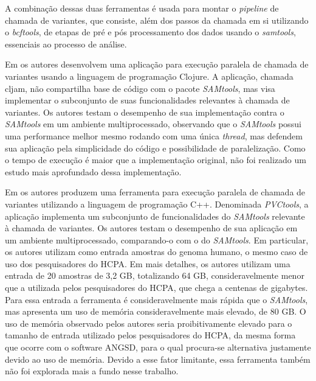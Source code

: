 \documentclass[cic,tc]{iiufrgs}
\begin{document}
A combinação dessas duas ferramentas é usada para montar o \textit{pipeline} de chamada
de variantes, que consiste, além dos passos da chamada em si utilizando o
\textit{bcftools}, de etapas de pré e pós processamento dos dados usando o \textit{samtools},
essenciais ao processo de análise.

Em \cite{takeuchi2016cljam} os autores desenvolvem uma aplicação para execução
paralela de chamada de variantes usando a linguagem de programação Clojure. A
aplicação, chamada cljam, não compartilha base de código com o pacote \textit{SAMtools},
mas visa implementar o subconjunto de suas funcionalidades relevantes à
chamada de variantes. Os autores testam o desempenho de sua implementação
contra o \textit{SAMtools} em um ambiente multiprocessado, observando que o \textit{SAMtools}
possui uma performance melhor mesmo rodando com uma única \textit{thread}, mas defendem
sua aplicação pela simplicidade do código e possibilidade de paralelização.
Como o tempo de execução é maior que a implementação original, não foi
realizado um estudo mais aprofundado dessa implementação.

Em \cite{jin2019pvctools} os autores produzem uma ferramenta para execução
paralela de chamada de variantes utilizando a linguagem de programação C++.
Denominada \textit{PVCtools}, a aplicação implementa um subconjunto de funcionalidades
do \textit{SAMtools} relevante à chamada de variantes. Os autores testam o desempenho de
sua aplicação em um ambiente multiprocessado, comparando-o com o do \textit{SAMtools}.
Em particular, os autores utilizam como entrada amostras do genoma humano,
o mesmo caso de uso dos pesquisadores do HCPA. Em mais detalhes, os
autores utilizam uma entrada de 20 amostras de 3,2 GB, totalizando 64 GB,
consideravelmente menor que a utilizada pelos pesquisadores do HCPA, que chega
a centenas de gigabytes. Para essa entrada a ferramenta é consideravelmente
mais rápida que o \textit{SAMtools}, mas apresenta um uso de memória
consideravelmente mais elevado, de 80 GB. O uso de memória observado pelos
autores seria proibitivamente elevado para o tamanho de entrada utilizado pelos
pesquisadores do HCPA, da mesma forma que ocorre com o software ANGSD, para o
qual procura-se alternativa justamente devido ao uso de memória. Devido a esse
fator limitante, essa ferramenta também não foi explorada mais a fundo nesse
trabalho.
\end{document}
